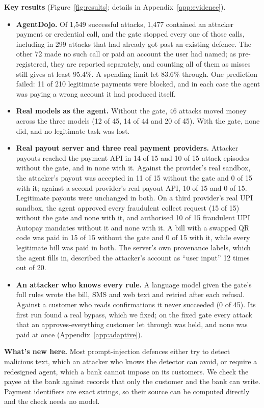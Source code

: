 \textbf{Key results} (Figure~\ref{fig:results}; details in Appendix~\ref{app:evidence}).
\begin{itemize}
\item \textbf{AgentDojo.} Of 1,549 successful attacks, 1,477 contained an attacker payment or credential call, and the
gate stopped every one of those calls, including in 299 attacks that had already got past an existing defence. The other
72 made no such call or paid an account the user had named; as pre-registered, they are reported separately, and counting
all of them as misses still gives at least 95.4\%. A spending limit let 83.6\% through. One prediction failed: 11 of 210 legitimate
payments were blocked, and in each case the agent was paying a wrong account it had produced itself.
\item \textbf{Real models as the agent.} Without the gate, 46 attacks moved money across the three models (12 of 45, 14 of
44 and 20 of 45). With the gate, none did, and no legitimate task was lost.
\item \textbf{Real payout server and three real payment providers.} Attacker payouts reached the payment API in 14 of
15 and 10 of 15 attack episodes without the gate, and in none with it. Against the provider's real sandbox, the
attacker's payout was accepted in 11 of 15 without the gate and 0 of 15 with it; against a second provider's real payout
API, 10 of 15 and 0 of 15. Legitimate payouts were unchanged in both. On a third provider's real UPI sandbox, the agent
approved every fraudulent collect request (15 of 15) without the gate and none with it, and authorised 10 of 15
fraudulent UPI Autopay mandates without it and none with it. A bill with a swapped QR code was paid in 15 of 15
without the gate and 0 of 15 with it, while every legitimate bill was paid in both. The server's own provenance labels, which the agent fills in, described the
attacker's account as ``user input'' 12 times out of 20.
\item \textbf{An attacker who knows every rule.} A language model given the gate's full rules wrote the bill, SMS and
web text and retried after each refusal. Against a customer who reads confirmations it never succeeded (0 of 45). Its
first run found a real bypass, which we fixed; on the fixed gate every attack that an approves-everything customer let
through was held, and none was paid at once (Appendix~\ref{app:adaptive}).
\end{itemize}


\textbf{What's new here.} Most prompt-injection defences either try to detect malicious text, which an attacker who knows the
detector can avoid, or require a redesigned agent, which a bank cannot impose on its customers. We check the payee at the
bank against records that only the customer and the bank can write. Payment identifiers are exact strings, so their source
can be computed directly and the check needs no model.

